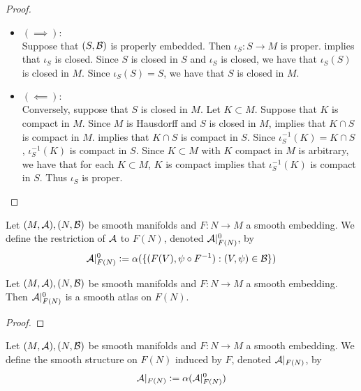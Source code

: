\documentclass{book}
\begin{document}
	\begin{proof}\
		\begin{itemize}
			\item $(\implies):$ \\
			Suppose that $(S, \mathcal{B})$ is properly embedded. Then $\iota_S:S \rightarrow M$ is proper.  implies that $\iota_S$ is closed. Since $S$ is closed in $S$ and $\iota_S$ is closed, we have that $\iota_S(S)$ is closed in $M$. Since $\iota_S(S) = S$, we have that $S$ is closed in $M$. 
			\item $(\impliedby):$ \\
			Conversely, suppose that $S$ is closed in $M$. Let $K \subset M$. Suppose that $K$ is compact in $M$. Since $M$ is Hausdorff and $S$ is closed in $M$,  implies that $K \cap S$ is compact in $M$.  implies that $K \cap S$ is compact in $S$. Since $\iota_S^{-1}(K) = K \cap S$, $\iota_S^{-1}(K)$ is compact in $S$. Since $K \subset M$ with $K$ compact in $M$ is arbitrary, we have that for each $K \subset M$, $K$ is compact implies that $\iota_S^{-1}(K)$ is compact in $S$. Thus $\iota_S$ is proper. 
		\end{itemize}
	\end{proof}

	\begin{defn}
		Let $(M, \mathcal{A}), (N, \mathcal{B})$ be smooth manifolds and $F: N \rightarrow M$ a smooth embedding. We define the restriction of $\mathcal{A}$ to $F(N)$, denoted $\mathcal{A}|^0_{F(N)}$, by 
		$$\mathcal{A}|^0_{F(N)} \vcentcolon= \alpha (\{(F(V), \psi \circ F^{-1} ): (V, \psi) \in \mathcal{B}\})$$
	\end{defn}

	\begin{ex}
		Let $(M, \mathcal{A}), (N, \mathcal{B})$ be smooth manifolds and $F: N \rightarrow M$ a smooth embedding. Then $\mathcal{A}|^0_{F(N)}$ is a smooth atlas on $F(N)$.
	\end{ex}

	\begin{proof}
		
	\end{proof}

	\begin{defn}
		Let $(M, \mathcal{A}), (N, \mathcal{B})$ be smooth manifolds and $F: N \rightarrow M$ a smooth embedding. We define the smooth structure on $F(N)$ induced by $F$, denoted $\mathcal{A}|_{F(N)}$, by 
		$$\mathcal{A}|_{F(N)} \vcentcolon= \alpha (\mathcal{A}|_{F(N)}^0)$$
	\end{defn}
\end{document}
